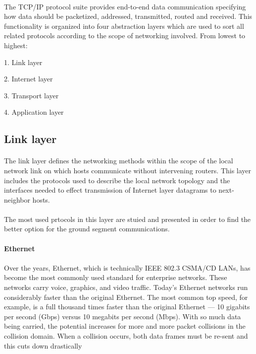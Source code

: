 \paragraph{}
The TCP/IP protocol suite provides end-to-end data communication specifying how data should be packetized, addressed, transmitted, routed and received. This functionality is organized into four abstraction layers which are used to sort all related protocols according to the scope of networking involved. From lowest to highest:
\begin{list}{}{}
\item 1. Link layer
\item 2. Internet layer
\item 3. Transport layer
\item 4. Application layer
\end{list}

\subsection{Link layer}
\paragraph{}
The link layer defines the networking methods within the scope of the local network link on which hosts communicate without intervening routers. This layer includes the protocols used to describe the local network topology and the interfaces needed to effect transmission of Internet layer datagrams to next-neighbor hosts. 
\paragraph{}
The most used prtocols in this layer are stuied and presented in order to find the better option for the ground segment communications.
\paragraph{}
\textbf{Ethernet}
\paragraph{}
Over the years, Ethernet, which is technically IEEE 802.3 CSMA/CD LANs, has become the most commonly used standard for enterprise networks. These networks carry voice, graphics, and video traffic.
Today’s Ethernet networks run considerably faster than the original Ethernet. The most common top speed, for example, is a full thousand times faster than the original Ethernet — 10 gigabits per second (Gbps) versus 10 megabits per second (Mbps).
With so much data being carried, the potential increases for more and more packet collisions in the collision domain. When a collision occurs, both data frames must be re-sent and this cuts down drastically 
